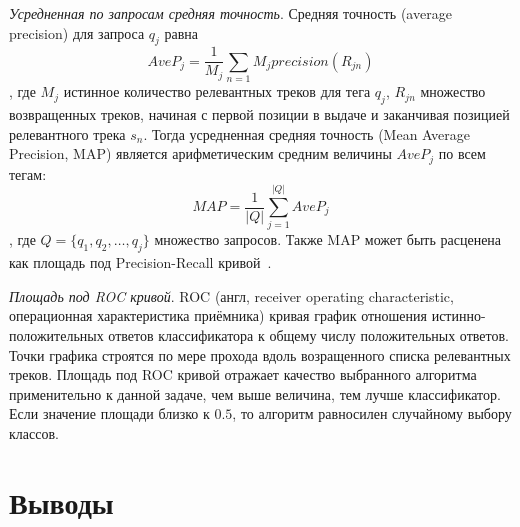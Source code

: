 \emph{Усредненная по запросам средняя точность}. Средняя точность (average precision) для запроса $q_j$ равна 
$$ AveP_j = \frac{1}{M_j} \sum_{n=1}{M_j} precision(R_{jn})$$,
где $M_j$ \ld истинное количество релевантных треков для тега $q_j$, $R_{jn}$ \ld множество возвращенных треков, начиная с первой позиции в выдаче и заканчивая позицией 
релевантного трека $s_n$. Тогда усредненная средняя точность (Mean Average Precision, MAP) является арифметическим средним величины $AveP_j$ по всем тегам:
$$ MAP = \frac{1}{|Q|} \sum_{j=1}^{|Q|} AveP_j $$, где $Q = \{q_1, q_2, \ldots, q_j\}$ \ld множество запросов. 
Также MAP может быть расценена как площадь под Precision-Recall кривой~\cite{prec_recall}.

\emph{Площадь под ROC кривой}. ROC (англ, receiver operating characteristic, операционная характеристика приёмника) кривая \ld график отношения истинно-положительных ответов классификатора
к общему числу положительных ответов. Точки графика строятся по мере прохода вдоль возращенного списка релевантных треков. Площадь под ROC кривой отражает качество выбранного алгоритма применительно
к данной задаче, чем выше величина, тем лучше классификатор. Если значение площади близко к $0.5$, то алгоритм равносилен случайному выбору классов.

\section{Выводы}





